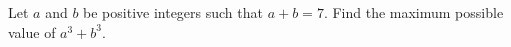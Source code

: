 Let $a$ and $b$ be positive integers such that $a+b=7$. Find the maximum possible value of $a^3+b^3$.
